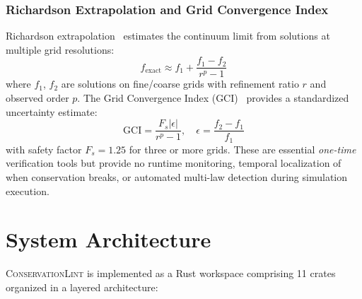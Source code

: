 \documentclass[11pt,a4paper]{article}
\begin{document}
\subsubsection{Richardson Extrapolation and Grid Convergence Index}
Richardson extrapolation~\citep{richardson1911} estimates the continuum limit from solutions at multiple grid resolutions:
\begin{equation}
    f_{\text{exact}} \approx f_1 + \frac{f_1 - f_2}{r^p - 1}
\end{equation}
where $f_1$, $f_2$ are solutions on fine/coarse grids with refinement ratio $r$ and observed order $p$. The Grid Convergence Index (GCI)~\citep{roache1998} provides a standardized uncertainty estimate:
\begin{equation}
    \text{GCI} = \frac{F_s |\epsilon|}{r^p - 1}, \quad \epsilon = \frac{f_2 - f_1}{f_1}
\end{equation}
with safety factor $F_s = 1.25$ for three or more grids. These are essential \emph{one-time} verification tools but provide no runtime monitoring, temporal localization of when conservation breaks, or automated multi-law detection during simulation execution.

\section{System Architecture}
\label{sec:architecture}

\textsc{ConservationLint} is implemented as a Rust workspace comprising 11 crates organized in a layered architecture:
\end{document}
